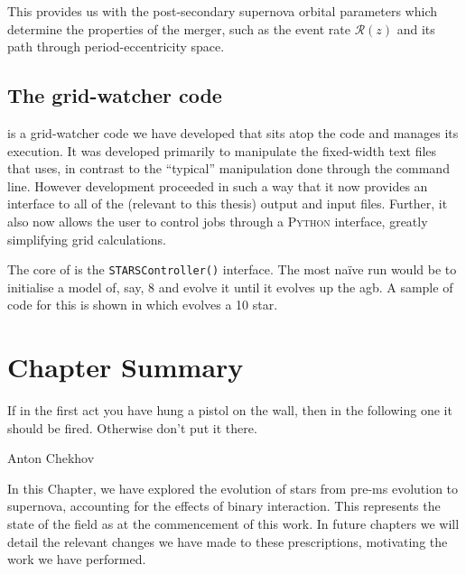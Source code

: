This provides us with the post-secondary supernova orbital parameters which determine the properties of the merger, such as the event rate $\mathcal{R}(z)$ and its path through period-eccentricity space.

\subsection{The  grid-watcher code}\label{chap:numerical_methods_kaitiaki}

 is a grid-watcher code we have developed that sits atop the  code and manages its execution. It was developed primarily to manipulate the fixed-width text files that  uses, in contrast to the ``typical'' manipulation done through the command line. However development proceeded in such a way that it now provides an interface to all of the (relevant to this thesis) output and input files. Further, it also now allows the user to control jobs through a \textsc{Python} interface, greatly simplifying grid calculations.

The core of  is the \texttt{STARSController()} interface. The most na\"ive run would be to initialise a model of, say, \SI{8}{\msun} and evolve it until it evolves up the \gls{agb}. A sample of code for this is shown in  which evolves a \SI{10}{\msun} star.


\section{Chapter Summary}

\epigraph{If in the first act you have hung a pistol on the wall, then in the following one it should be fired. Otherwise don't put it there.}{Anton Chekhov}

In this Chapter, we have explored the evolution of stars from pre-\gls{ms} evolution to supernova, accounting for the effects of binary interaction. This represents the state of the field as at the commencement of this work. In future chapters we will detail the relevant changes we have made to these prescriptions, motivating the work we have performed.